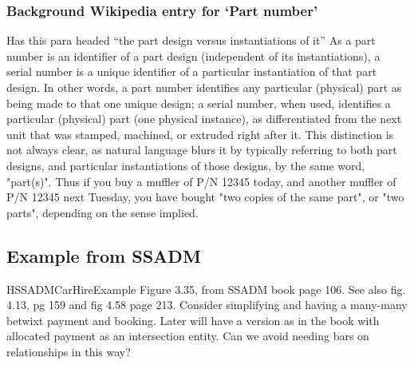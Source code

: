 \subsubsection{Background Wikipedia entry for `Part number'}
Has this para headed ``the part design versus instantiations of it''
As a part number is an identifier of a part design (independent of its instantiations), a serial number is a unique identifier of a particular instantiation of that part design. In other words, a part number identifies any particular (physical) part as being made to that one unique design; a serial number, when used, identifies a particular (physical) part (one physical instance), as differentiated from the next unit that was stamped, machined, or extruded right after it. This distinction is not always clear, as natural language blurs it by typically referring to both part designs, and particular instantiations of those designs, by the same word, "part(s)". Thus if you buy a muffler of P/N 12345 today, and another muffler of P/N 12345 next Tuesday, you have bought "two copies of the same part", or "two parts", depending on the sense implied.

\subsection{Example from SSADM}
\begin{erboxedFigure} {H}{SSADMCarHireExample}{
Figure 3.35, from SSADM book page 106. See also fig. 4.13, pg 159 and fig 4.58 page 213.
Consider simplifying and having a many-many betwixt payment and booking. 
Later will have a version as in the book with allocated payment as an intersection entity. 
Can we avoid needing bars on relationships in this way?
}
\begin{center}
\scalebox{0.95}{}
\end{center}
\end{erboxedFigure}